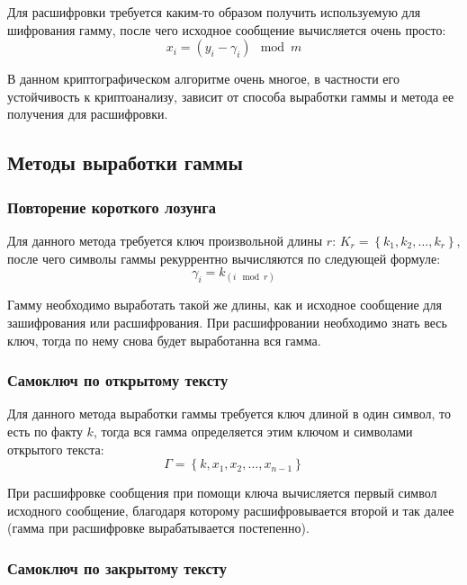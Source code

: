 \documentclass[a4paper]{article}
\begin{document}
  Для расшифровки требуется каким-то образом получить используемую для шифрования гамму,
  после чего исходное сообщение вычисляется очень просто:
  \begin{equation}
    x_i = (y_i - \gamma_i) \mod m
  \end{equation}

  В данном криптографическом алгоритме очень многое, в частности его устойчивость к криптоанализу,
  зависит от способа выработки гаммы и метода ее получения для расшифровки.

  \subsection{Методы выработки гаммы}

  \subsubsection{Повторение короткого лозунга}

  Для данного метода требуется ключ произвольной длины $r$: $K_r = \left\{k_1, k_2,  \dots, k_r\right\}$,
  после чего символы гаммы рекуррентно вычисляются по следующей формуле:
  \begin{equation}
    \gamma_i = k_{\left(i\mod{r}\right)}
  \end{equation}

  Гамму необходимо выработать такой же длины, как и исходное сообщение для зашифрования или расшифрования.
  При расшифровании необходимо знать весь ключ, тогда по нему снова будет выработанна вся гамма.

  \subsubsection{Самоключ по открытому тексту}

  Для данного метода выработки гаммы требуется ключ длиной в один символ, то есть по факту $k$,
  тогда вся гамма определяется этим ключом и символами открытого текста:
  \begin{equation}
    \Gamma = \left\{k, x_1, x_2, \dots, x_{n - 1}\right\}
  \end{equation}

  При расшифровке сообщения при помощи ключа вычисляется первый символ исходного сообщение,
  благодаря которому расшифровывается второй и так далее (гамма при расшифровке вырабатывается постепенно).

  \subsubsection{Самоключ по закрытому тексту}
\end{document}
